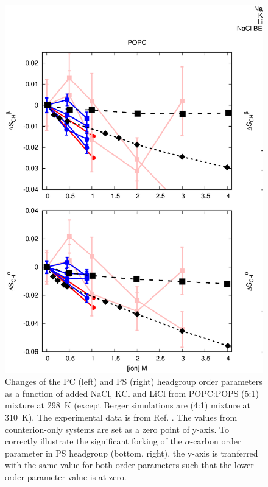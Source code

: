 \documentclass[journal=jpcbfk]{achemso}
\begin{document}
\begin{figure}[]
  \centering
  \includegraphics[width=17.0cm]{../Figs/CHANGESwithMONVALENTwithPS.eps}
  \caption{\label{PSresponseTONaCl}
    Changes of the PC (left) and PS (right) headgroup order parameters as a function of
    added NaCl, KCl and LiCl from POPC:POPS (5:1) mixture at 298~K
    (except Berger simulations are (4:1) mixture at 310~K).
    The experimental data is from Ref. .
    The values from counterion-only systems are set as a zero point of y-axis.
    To correctly illustrate the significant forking of the $\alpha$-carbon order parameter
    in PS headgroup (bottom, right), the y-axis is tranferred with the same value for both order parameters such that the lower order
    parameter value is at zero.
  }
\end{figure}
\end{document}
